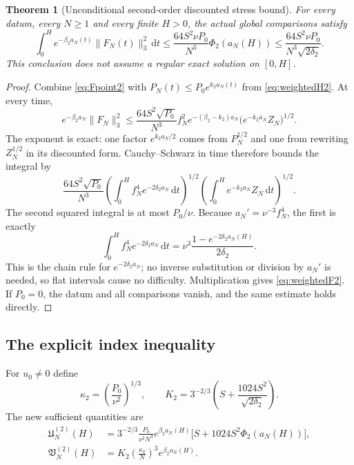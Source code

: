 \documentclass[11pt,a4paper]{article}
\newtheorem{theorem}{Theorem}[section]
\theoremstyle{definition}\newtheorem{definition}[theorem]{Definition}
\theoremstyle{remark}\newtheorem{remark}[theorem]{Remark}
\newcommand{\dd}{\,\mathrm d}
\newcommand{\norm}[1]{\lVert #1\rVert}
\numberwithin{equation}{section}
\begin{document}
\begin{theorem}[Unconditional second-order discounted stress bound]\label{thm:weightedF2}
For every datum, every $N\ge1$ and every finite $H>0$, the actual global comparisons satisfy
\begin{equation}\label{eq:weightedF2}
 \boxed{\quad
 \int_0^H e^{-\beta_2a_N(t)}\norm{F_N(t)}_3^2\dd t
 \le\frac{64S^2\nu P_0}{N^3}\Phi_2(a_N(H))
 \le\frac{64S^2\nu P_0}{N^3\sqrt{2\delta_2}}.
 \quad}
\end{equation}
This conclusion does not assume a regular exact solution on $[0,H]$.
\end{theorem}
\begin{proof}
Combine \eqref{eq:Fpoint2} with $P_N(t)\le P_0e^{k_2a_N(t)}$ from \eqref{eq:weightedH2}. At every time,
\[
 e^{-\beta_2a_N}\norm{F_N}_3^2
 \le\frac{64S^2\sqrt{P_0}}{N^3}
       f_N^2e^{-(\beta_2-k_2)a_N}
       \bigl(e^{-k_2a_N}Z_N\bigr)^{1/2}.
\]
The exponent is exact: one factor $e^{k_2a_N/2}$ comes from $P_N^{1/2}$ and one from rewriting $Z_N^{1/2}$ in its discounted form. Cauchy--Schwarz in time therefore bounds the integral by
\[
 \frac{64S^2\sqrt{P_0}}{N^3}
 \left(\int_0^H f_N^4e^{-2\delta_2a_N}\dd t\right)^{1/2}
 \left(\int_0^H e^{-k_2a_N}Z_N\dd t\right)^{1/2}.
\]
The second squared integral is at most $P_0/\nu$. Because $a_N'=\nu^{-3}f_N^4$, the first is exactly
\begin{equation}\label{eq:primitive2}
 \int_0^H f_N^4e^{-2\delta_2a_N}\dd t
 =\nu^3\frac{1-e^{-2\delta_2a_N(H)}}{2\delta_2}.
\end{equation}
This is the chain rule for $e^{-2\delta_2a_N}$; no inverse substitution or division by $a_N'$ is needed, so flat intervals cause no difficulty. Multiplication gives \eqref{eq:weightedF2}. If $P_0=0$, the datum and all comparisons vanish, and the same estimate holds directly.
\end{proof}

\subsection{The explicit index inequality}
For $u_0\ne0$ define
\begin{equation}\label{eq:K2}
 \kappa_2=\left(\frac{P_0}{\nu^2}\right)^{1/3},\qquad
 K_2=3^{-2/3}\left(S+\frac{1024S^2}{\sqrt{2\delta_2}}\right).
\end{equation}
The new sufficient quantities are
\begin{align}
 \mathfrak U_N^{(2)}(H)
 &=3^{-2/3}\frac{P_0}{\nu^2N^3}e^{\beta_2a_N(H)}
       \bigl[S+1024S^2\Phi_2(a_N(H))\bigr],\label{eq:U2}\\
 \mathfrak V_N^{(2)}(H)
 &=K_2\left(\frac{\kappa_2}{N}\right)^3e^{\beta_2a_N(H)}.
 \label{eq:V2}
\end{align}
\end{document}
